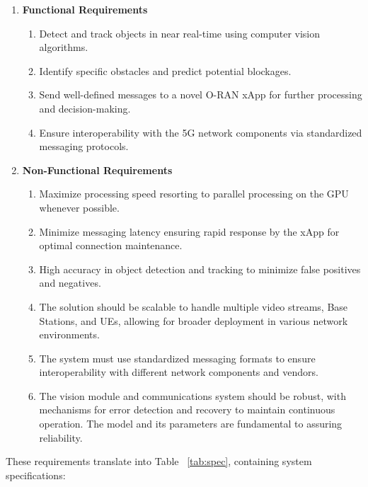 \begin{enumerate}
    \item \textbf{Functional Requirements}
    \begin{enumerate}
        \item Detect and track objects in near real-time using computer vision algorithms.
        \item Identify specific obstacles and predict potential blockages.
        \item Send well-defined messages to a novel O-RAN xApp for further processing and decision-making.
        \item Ensure interoperability with the 5G network components via standardized messaging protocols. %
    \end{enumerate}
    \item \textbf{Non-Functional Requirements}
    \begin{enumerate}
        \item Maximize processing speed resorting to parallel processing on the GPU whenever possible\@.
        \item Minimize messaging latency ensuring rapid response by the xApp for optimal connection maintenance.
        \item High accuracy in object detection and tracking to minimize false positives and negatives.
        \item The solution should be scalable to handle multiple video streams, Base Stations, and UEs, allowing for broader deployment in various network environments.
        \item The system must use standardized messaging formats to ensure interoperability with different network components and vendors.
        \item The vision module and communications system should be robust, with mechanisms for error detection and recovery to maintain continuous operation.
        The model and its parameters are fundamental to assuring reliability. %
    \end{enumerate}
\end{enumerate}

These requirements translate into Table ~\ref{tab:spec}, containing system specifications:

